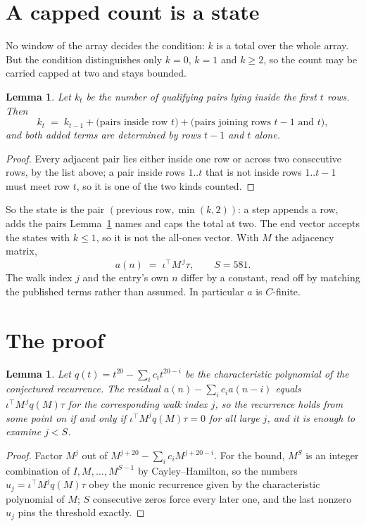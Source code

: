 \documentclass[11pt,a4paper]{article}
\theoremstyle{plain}
\newtheorem{lemma}[theorem]{Lemma}
\theoremstyle{definition}
\begin{document}
\section{A capped count is a state}

No window of the array decides the condition: $k$ is a total over the whole array. But the
condition distinguishes only $k=0$, $k=1$ and $k\ge2$, so the count may be carried capped at
two and stays bounded.

\begin{lemma}\label{lem:cap}
Let $k_t$ be the number of qualifying pairs lying inside the first $t$ rows. Then
\[
k_{t}\;=\;k_{t-1}+\bigl(\text{pairs inside row } t\bigr)
+\bigl(\text{pairs joining rows } t-1 \text{ and } t\bigr),
\]
and both added terms are determined by rows $t-1$ and $t$ alone.
\end{lemma}

\begin{proof}
Every adjacent pair lies either inside one row or across two consecutive rows, by the list
above; a pair inside rows $1..t$ that is not inside rows $1..t-1$ must meet row $t$, so it is
one of the two kinds counted.
\end{proof}

So the state is the pair $(\text{previous row},\min(k,2))$: a step appends a row, adds the
pairs Lemma~\ref{lem:cap} names and caps the total at two. The end vector accepts the states
with $k\le1$, so it is not the all-ones vector. With $M$ the adjacency matrix,
\[
a(n)\;=\;\iota^{\!\top}M^{\,j}\tau ,\qquad S=581.
\]
The walk index $j$ and the entry's own $n$ differ by a constant, read off by matching the
published terms rather than assumed. In particular $a$ is $C$-finite.

\section{The proof}

\begin{lemma}\label{lem:crit}
Let $q(t)=t^{20}-\sum_i c_it^{20-i}$ be the characteristic polynomial of the
conjectured recurrence. The residual $a(n)-\sum_ic_ia(n-i)$ equals
$\iota^{\!\top}M^{\,j}q(M)\tau$ for the corresponding walk index $j$, so the recurrence
holds from some point on if and only if $\iota^{\!\top}M^{j}q(M)\tau=0$ for all large $j$,
and it is enough to examine $j<S$.
\end{lemma}

\begin{proof}
Factor $M^{j}$ out of $M^{j+20}-\sum_ic_iM^{j+20-i}$. For the bound, $M^{S}$
is an integer combination of $I,M,\dots,M^{S-1}$ by Cayley--Hamilton, so the numbers
$u_j=\iota^{\!\top}M^{j}q(M)\tau$ obey the monic recurrence given by the characteristic
polynomial of $M$; $S$ consecutive zeros force every later one, and the last nonzero $u_j$
pins the threshold exactly.
\end{proof}
\end{document}
